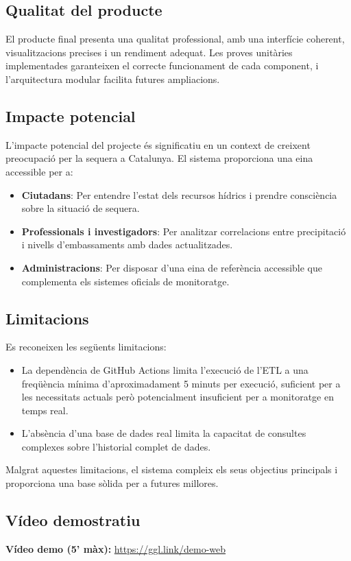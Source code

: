 \subsection{Qualitat del producte}

El producte final presenta una qualitat professional, amb una interfície coherent, visualitzacions precises i un rendiment adequat. Les proves unitàries implementades garanteixen el correcte funcionament de cada component, i l'arquitectura modular facilita futures ampliacions.

\subsection{Impacte potencial}

L'impacte potencial del projecte és significatiu en un context de creixent preocupació per la sequera a Catalunya. El sistema proporciona una eina accessible per a:

\begin{itemize}
    \item \textbf{Ciutadans}: Per entendre l'estat dels recursos hídrics i prendre consciència sobre la situació de sequera.
    \item \textbf{Professionals i investigadors}: Per analitzar correlacions entre precipitació i nivells d'embassaments amb dades actualitzades.
    \item \textbf{Administracions}: Per disposar d'una eina de referència accessible que complementa els sistemes oficials de monitoratge.
\end{itemize}

\subsection{Limitacions}

Es reconeixen les següents limitacions:

\begin{itemize}
    \item La dependència de GitHub Actions limita l'execució de l'ETL a una freqüència mínima d'aproximadament 5 minuts per execució, suficient per a les necessitats actuals però potencialment insuficient per a monitoratge en temps real.
    \item L'absència d'una base de dades real limita la capacitat de consultes complexes sobre l'historial complet de dades.
\end{itemize}

Malgrat aquestes limitacions, el sistema compleix els seus objectius principals i proporciona una base sòlida per a futures millores.

\subsection{Vídeo demostratiu}

\textbf{Vídeo demo (5' màx):} \url{https://ggl.link/demo-web}

